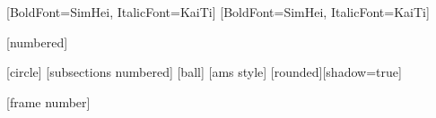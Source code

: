 \usepackage{xcolor}
\usepackage{appendixnumberbeamer}
\usepackage{bookmark}
\usepackage{ctex}
\usepackage{caption}
\usepackage{subfigure}
\usepackage{fontspec}
\usepackage{amsmath}
\usepackage{amsthm}
\usepackage{unicode-math}
\usepackage{amssymb}
\usepackage{graphicx}
\usepackage{float}
\usepackage{color}
\usepackage{bm} %
\usepackage[
    backend=biber,
    style=authoryear,
    sorting = nty,
    hyperref=true,
    doi=false
]{biblatex}



\setmainfont[Scale=1.0]{STIX Two Text}
\setsansfont[
    BoldFont={STIX Two Text SemiBold},
    ItalicFont={STIX Two Text Italic}
    ]{Arial}
[BoldFont=SimHei, ItalicFont=KaiTi]
[BoldFont=SimHei, ItalicFont=KaiTi]

[numbered]
\setlength{}

[circle]
[subsections numbered]
[ball]
[ams style]
[rounded][shadow=true]

[frame number]

\theoremstyle{remark}
\newtheorem{assump}[theorem]{Identification Assumption}

\newenvironment{wideitemize}{\itemize\addtolength{\itemsep}{0.5em} }{\enditemize}
